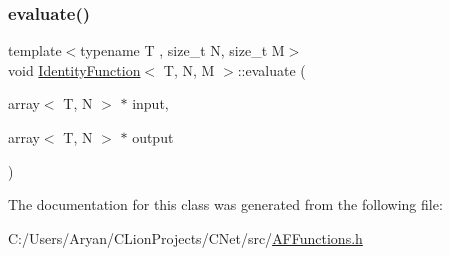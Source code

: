 \mbox{\label{class_identity_function_af9dea511c5f9074f233aa0ffbc0fe18b}} 
\subsubsection{\texorpdfstring{evaluate()}{evaluate()}}
{\footnotesize\ttfamily template$<$typename T , size\+\_\+t N, size\+\_\+t M$>$ \\
void \hyperlink{class_identity_function}{Identity\+Function}$<$ T, N, M $>$\+::evaluate (\begin{DoxyParamCaption}\item[{array$<$ T, N $>$ $\ast$}]{input,  }\item[{array$<$ T, N $>$ $\ast$}]{output }\end{DoxyParamCaption})\hspace{0.3cm}{\ttfamily [inline]}}



The documentation for this class was generated from the following file\+:\begin{DoxyCompactItemize}
\item 
C\+:/\+Users/\+Aryan/\+C\+Lion\+Projects/\+C\+Net/src/\hyperlink{_a_f_functions_8h}{A\+F\+Functions.\+h}\end{DoxyCompactItemize}
